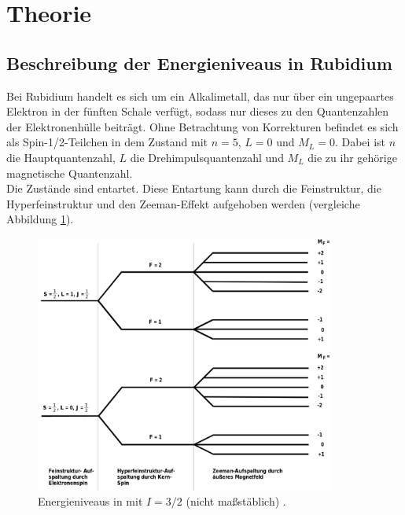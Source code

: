 \section{Theorie}
\label{sec:Theorie}

\subsection{Beschreibung der Energieniveaus in Rubidium}
\label{subsec:energieniveaus}

Bei Rubidium handelt es sich um ein Alkalimetall, das nur über ein ungepaartes Elektron in der fünften Schale verfügt, sodass nur dieses zu den Quantenzahlen der Elektronenhülle beiträgt.
Ohne Betrachtung von Korrekturen befindet es sich als Spin-1/2-Teilchen in dem Zustand mit $n=5$, $L=0$ und $M_L=0$. Dabei ist $n$ die Hauptquantenzahl, $L$ die Drehimpulsquantenzahl und $M_L$ die zu ihr gehörige magnetische Quantenzahl. \\
Die Zustände sind entartet. Diese Entartung kann durch die Feinstruktur, die Hyperfeinstruktur und den Zeeman-Effekt aufgehoben werden (vergleiche Abbildung \ref{fig:energieniveaus}).

\begin{figure}
  	\centering
  	\includegraphics[width=0.88\textwidth,keepaspectratio]{content/images/energieniveaus.png}
  	\caption{Energieniveaus in  mit $I=3/2$ (nicht maßstäblich) \cite{alt}.}
  	\label{fig:energieniveaus}
\end{figure}

